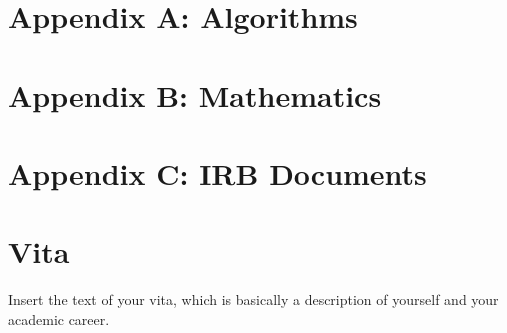 \documentclass[12pt,letterpaper]{lsuetd}
\begin{document}
%
\doublespacing



\pagebreak
\singlespacing
{}
\appendix
\chapter{Appendix A: Algorithms}
\vspace{0.5em}

\pagebreak
\chapter{Appendix B: Mathematics}
\vspace{0.5em}

\pagebreak

\chapter{Appendix C: IRB Documents}
\vspace{0.5em}

\pagebreak

% 


\chapter*{Vita}
\doublespacing
\setlength{\parindent}{1.75em}
\vspace{0.2em}
Insert the text of your vita, which is basically a description of yourself and your academic career.
\end{document}
